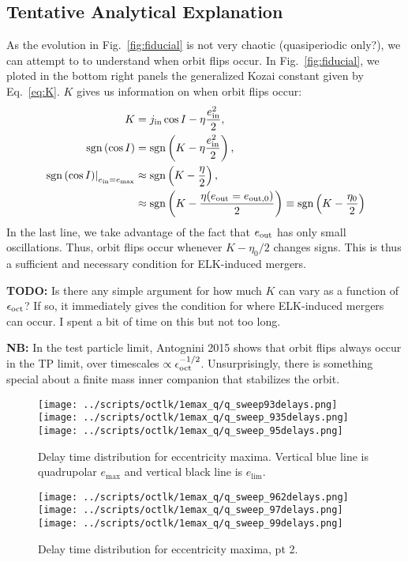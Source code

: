 \documentclass[11pt,
        usenames, %
        dvipsnames %
    ]{article}
\newcommand*{\at}[1]{\left.#1\right|}
\newcommand*{\p}[1]{\left(#1\right)}
\DeclareMathOperator{\sgn}{sgn}
\begin{document}
\subsection{Tentative Analytical Explanation}

As the evolution in Fig.~\ref{fig:fiducial} is not very chaotic (quasiperiodic
only?), we can attempt to to understand when orbit flips occur. In
Fig.~\ref{fig:fiducial}, we ploted in the bottom right panels the generalized
Kozai constant given by Eq.~\eqref{eq:K}. $K$ gives us information on when orbit
flips occur:
\begin{align}
    K &= j_{\rm in}\cos I - \eta \frac{e_{\rm in}^2}{2},\\
    \sgn\p{\cos I} &= \sgn\p{K - \eta \frac{e_{\rm in}^2}{2}},\\
    \at{\sgn\p{\cos I}}_{e_{\rm in} = e_{\max}}
        &\approx \sgn\p{K - \frac{\eta}{2}},\nonumber\\
        &\approx \sgn\p{K - \frac{\eta(e_{\rm out} = e_{\rm out, 0})}{2}}
        \equiv \sgn\p{K - \frac{\eta_0}{2}}
\end{align}
In the last line, we take advantage of the fact that $e_{\rm out}$ has only
small oscillations. Thus, orbit flips occur whenever $K - \eta_0/2$ changes
signs. This is thus a sufficient and necessary condition for ELK-induced
mergers.

\textbf{TODO:} Is there any simple argument for how much $K$ can vary as a
function of $\epsilon_{\rm oct}$? If so, it immediately gives the condition for
where ELK-induced mergers can occur. I spent a bit of time on this but not too
long.

\textbf{NB:} In the test particle limit, Antognini 2015 shows that orbit flips
always occur in the TP limit, over timescales $\propto \epsilon_{\rm
oct}^{-1/2}$. Unsurprisingly, there is something special about a finite mass
inner companion that stabilizes the orbit.

\begin{figure}
    \centering
    \texttt{[image: ../scripts/octlk/1emax\_q/q\_sweep93delays.png]}
    \texttt{[image: ../scripts/octlk/1emax\_q/q\_sweep\_935delays.png]}
    \texttt{[image: ../scripts/octlk/1emax\_q/q\_sweep\_95delays.png]}
    \caption{Delay time distribution for eccentricity maxima. Vertical blue line
    is quadrupolar $e_{\max}$ and vertical black line is $e_{\lim}$.}\label{fig:delays}
\end{figure}
\begin{figure}
    \centering
    \texttt{[image: ../scripts/octlk/1emax\_q/q\_sweep\_962delays.png]}
    \texttt{[image: ../scripts/octlk/1emax\_q/q\_sweep\_97delays.png]}
    \texttt{[image: ../scripts/octlk/1emax\_q/q\_sweep\_99delays.png]}
    \caption{Delay time distribution for eccentricity maxima, pt 2.}\label{fig:delays2}
\end{figure}
\end{document}

